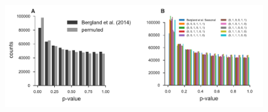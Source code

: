 \documentclass[11pt]{article}
\begin{document}

\begin{figure}[!ht]
  \centering
  \includegraphics[]{figures/bergland-combined-hists.pdf}
  \caption{}
  \label{suppfig:bergland-pvalue-hist}
\end{figure}
\end{document}

